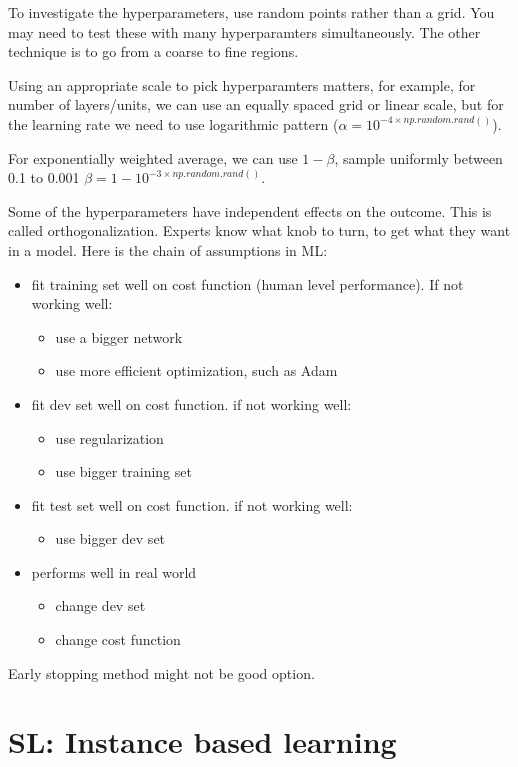 \documentclass[12pt]{report}
\begin{document}
To investigate the hyperparameters, use random points rather than a grid. You may need to test these with many hyperparamters simultaneously. The other technique is to go from a coarse to fine regions.

Using an appropriate scale to pick hyperparamters matters, for example, for number of layers/units, we can use an equally spaced grid or linear scale, but for the learning rate we need to use logarithmic pattern ($\alpha = 10^{-4 \times np.random.rand()}$).

For exponentially weighted average, we can use $1-\beta$, sample uniformly between 0.1 to 0.001 $\beta = 1-10^{-3 \times np.random.rand()}$.

Some of the hyperparameters have independent effects on the outcome. This is called orthogonalization. Experts know what knob to turn, to get what they want in a model. Here is the chain of assumptions in ML:
\begin{itemize}
  \item fit training set well on cost function (human level performance). If not working well:
  \begin{itemize}
    \item use a bigger network
    \item use more efficient optimization, such as Adam
  \end{itemize}
  \item fit dev set well on cost function. if not working well:
  \begin{itemize}
    \item use regularization
    \item use bigger training set
  \end{itemize}
  \item fit test set well on cost function. if not working well:
  \begin{itemize}
    \item use bigger dev set
  \end{itemize}
  \item performs well in real world
  \begin{itemize}
    \item change dev set
    \item change cost function
  \end{itemize}
\end{itemize}

Early stopping method might not be good option.

\section{SL: Instance based learning}
\end{document}
